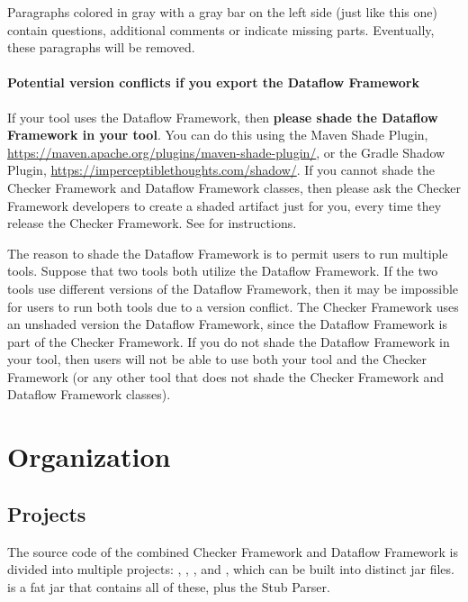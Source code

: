 \begin{workinprogress}
    Paragraphs colored in gray with a gray bar on the left side (just
    like this one) contain questions, additional comments or indicate
    missing parts. Eventually, these paragraphs will be removed.
\end{workinprogress}


\paragraph{Potential version conflicts if you export the Dataflow Framework}

If your tool uses the Dataflow Framework, then \textbf{please shade the
  Dataflow Framework in your tool}.  You can do this using the Maven Shade
Plugin, \url{https://maven.apache.org/plugins/maven-shade-plugin/}, or the
Gradle Shadow Plugin, \url{https://imperceptiblethoughts.com/shadow/}.
If you cannot shade the Checker Framework and Dataflow Framework classes, then
please ask the Checker Framework developers to create a shaded artifact
just for you, every time they release the Checker Framework.
See  for instructions.

The reason to shade the Dataflow Framework is to permit users to run multiple tools.
Suppose that two tools both utilize the Dataflow Framework.
If the two tools use different versions of the Dataflow Framework,
then it may be impossible for users to run both tools due to a version conflict.
The Checker Framework uses an unshaded version the Dataflow Framework,
since the Dataflow Framework is part of the Checker Framework.
If you do not shade the Dataflow Framework in your tool, then users will
not be able to use both your tool and the Checker Framework (or any other
tool that does not shade the Checker Framework and Dataflow Framework classes).


\section{Organization}

\subsection{Projects}

The source code of the combined Checker Framework and Dataflow
Framework is divided into multiple projects: ,
, , and ,
which can be built into distinct jar files.   is a fat
jar that contains all of these, plus the Stub Parser.

